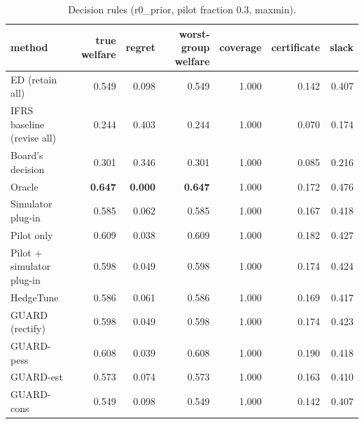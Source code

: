 \begin{table}[t]
\centering
\small
\begin{tabular}{lrrrrrr}
\toprule
method & true welfare & regret & worst-group welfare & coverage & certificate & slack \\
\midrule
ED (retain all) & 0.549 & 0.098 & 0.549 & 1.000 & 0.142 & 0.407 \\
IFRS baseline (revise all) & 0.244 & 0.403 & 0.244 & 1.000 & 0.070 & 0.174 \\
Board's decision & 0.301 & 0.346 & 0.301 & 1.000 & 0.085 & 0.216 \\
Oracle & \textbf{0.647} & \textbf{0.000} & \textbf{0.647} & 1.000 & 0.172 & 0.476 \\
Simulator plug-in & 0.585 & 0.062 & 0.585 & 1.000 & 0.167 & 0.418 \\
Pilot only & 0.609 & 0.038 & 0.609 & 1.000 & 0.182 & 0.427 \\
Pilot + simulator plug-in & 0.598 & 0.049 & 0.598 & 1.000 & 0.174 & 0.424 \\
HedgeTune & 0.586 & 0.061 & 0.586 & 1.000 & 0.169 & 0.417 \\
GUARD (rectify) & 0.598 & 0.049 & 0.598 & 1.000 & 0.174 & 0.423 \\
GUARD-pess & 0.608 & 0.039 & 0.608 & 1.000 & 0.190 & 0.418 \\
GUARD-est & 0.573 & 0.074 & 0.573 & 1.000 & 0.163 & 0.410 \\
GUARD-cons & 0.549 & 0.098 & 0.549 & 1.000 & 0.142 & 0.407 \\
\bottomrule
\end{tabular}
\caption{Decision rules (r0\_prior, pilot fraction 0.3, maxmin).}
\label{tab:methods-maxmin}
\end{table}
